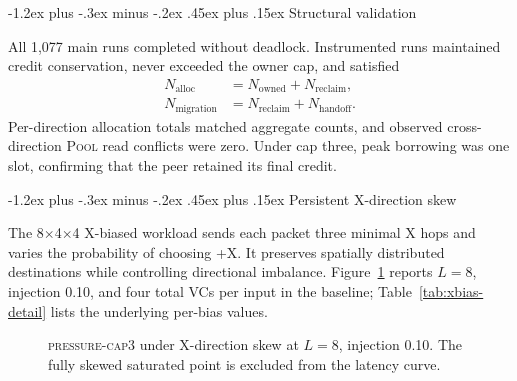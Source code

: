 \documentclass[10pt,twocolumn]{article}
\makeatletter
\newcommand{\pool}{\textsc{Pool}\xspace}
\newcommand{\privatefour}{\textsc{private-v4}\xspace}
\newcommand{\capthree}{\textsc{pressure-cap3}\xspace}
\renewcommand\subsection{\@startsection{subsection}{2}{\z@}%
  {-1.2ex plus -.3ex minus -.2ex}%
  {.45ex plus .15ex}%
  {\normalfont\normalsize\bfseries}}
\makeatother
\begin{document}
\subsection{Structural validation}

All 1,077 main runs completed without deadlock. Instrumented runs maintained
credit conservation, never exceeded the owner cap, and satisfied
\begin{align}
N_{\mathrm{alloc}} &=
N_{\mathrm{owned}}+N_{\mathrm{reclaim}},\\
N_{\mathrm{migration}} &=
N_{\mathrm{reclaim}}+N_{\mathrm{handoff}}.
\end{align}
Per-direction allocation totals matched aggregate counts, and observed
cross-direction \pool read conflicts were zero. Under cap three, peak
borrowing was one slot, confirming that the peer retained its final credit.

\subsection{Persistent X-direction skew}
\label{sec:eval-skew}

The 8$\times$4$\times$4 X-biased workload sends each packet three minimal
X hops and varies the probability of choosing +X. It preserves spatially
distributed destinations while controlling directional imbalance.
Figure~\ref{fig:skew} reports $L=8$, injection 0.10, and four total VCs per
input in the baseline; Table~\ref{tab:xbias-detail} lists the underlying
per-bias values.

\begin{figure}[t]
\centering
{}
\caption{\capthree under X-direction skew at $L=8$, injection 0.10. The
fully skewed saturated point is excluded from the latency curve.}
\label{fig:skew}
\end{figure}
\end{document}
